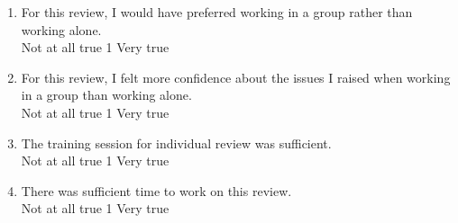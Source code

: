 \begin {enumerate}
\item For this review, I would have preferred working in a group rather
than working alone.
\\
Not at all true \hfill 1     \hfill Very true\\

\item For this review, I felt more confidence about the issues I
raised when working in a group than working alone.
\\
Not at all true \hfill 1     \hfill Very true\\




\item The training session for individual review was sufficient.
\\
Not at all true \hfill 1    
\hfill Very true\\

\item There was sufficient time to work on this review.
\\
Not at all true \hfill 1     \hfill Very true\\


\end{enumerate}

